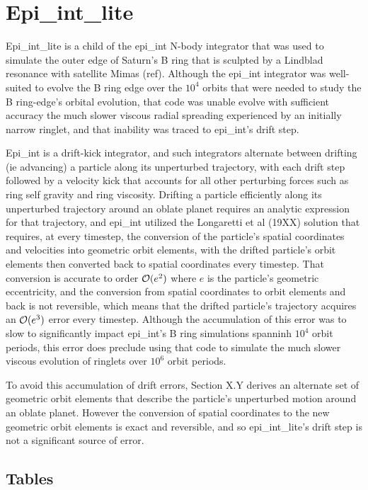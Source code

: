 \documentclass[preprint]{aastex62}
\begin{document}
\section{Epi\_int\_lite} \label{sec:epi_int_lite}

Epi\_int\_lite is a child of the epi\_int N-body integrator that was used to
simulate the outer edge of Saturn's B ring that is sculpted by a Lindblad resonance
with satellite Mimas (ref). Although the epi\_int integrator was well-suited to evolve the
B ring edge over the $10^4$ orbits that were needed to study the B ring-edge's orbital evolution,
that code was unable evolve with sufficient accuracy the much slower viscous
radial spreading experienced by an initially narrow ringlet, and that inability
was traced to epi\_int's drift step. 

Epi\_int is a drift-kick integrator, and such integrators alternate between drifting
(ie advancing) a particle along its unperturbed trajectory, with each drift step followed
by a velocity kick that accounts for all other perturbing forces such as ring self gravity
and ring viscosity. Drifting a particle efficiently along its unperturbed trajectory around
an oblate planet requires an analytic
expression for that trajectory, and epi\_int utilized the Longaretti et al (19XX) solution
that requires, at every timestep, the conversion of the particle's spatial coordinates
and velocities into geometric orbit elements, with the drifted particle's
orbit elements then converted back to spatial coordinates every timestep. That conversion is accurate
to order ${\cal O}(e^2)$ where $e$ is the particle's geometric eccentricity, and the
conversion from spatial coordinates to orbit elements and back is not reversible, which
means that the drifted particle's trajectory acquires an ${\cal O}(e^3)$ error
every timestep. Although the accumulation of this error was to slow to significantly impact
epi\_int's B ring simulations spanninh $10^4$ orbit periods, this error does preclude 
using that code to simulate the much slower viscous evolution of ringlets over $10^6$ orbit periods.

To avoid this accumulation of drift errors, Section X.Y derives an alternate set of geometric
orbit elements that describe the particle's unperturbed motion around an oblate planet. However
the conversion of spatial coordinates to the new geometric orbit elements is exact
and reversible, and so epi\_int\_lite's drift step is not a significant source of error.

\subsection{Tables} \label{subsec:tables}
\end{document}
